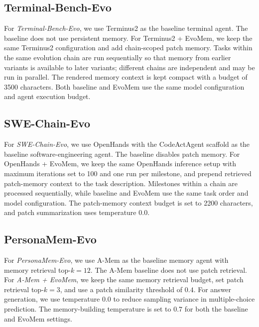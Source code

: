 \documentclass{article}
\begin{document}
\subsection{Terminal-Bench-Evo}

For \emph{Terminal-Bench-Evo}, we use Terminus2 as the baseline terminal agent. The baseline does not use persistent memory. For Terminus2 + EvoMem, we keep the same Terminus2 configuration and add chain-scoped patch memory. Tasks within the same evolution chain are run sequentially so that memory from earlier variants is available to later variants; different chains are independent and may be run in parallel. The rendered memory context is kept compact with a budget of 3500 characters. Both baseline and EvoMem use the same model configuration and agent execution budget.



\subsection{SWE-Chain-Evo}
For \emph{SWE-Chain-Evo}, we use OpenHands with the CodeActAgent scaffold as the baseline software-engineering agent. The baseline disables patch memory. For OpenHands + EvoMem, we keep the same OpenHands inference setup with maximum iterations set to 100 and one run per milestone, and prepend retrieved patch-memory context to the task description. Milestones within a chain are processed sequentially, while baseline and EvoMem use the same task order and model configuration. The patch-memory context budget is set to 2200 characters, and patch summarization uses temperature $0.0$.



\subsection{PersonaMem-Evo}

\label{app:setting_persona_mem_evo}

For \emph{PersonaMem-Evo}, we use A-Mem \cite{xu2025amem} as the baseline memory agent with memory retrieval top-$k=12$. The A-Mem baseline does not use patch retrieval. For \emph{A-Mem + EvoMem}, we keep the same memory retrieval budget, set patch retrieval top-$k=3$, and use a patch similarity threshold of $0.4$. For answer generation, we use temperature $0.0$ to reduce sampling variance in multiple-choice prediction. The memory-building temperature is set to $0.7$ for both the baseline and EvoMem settings.
\end{document}
